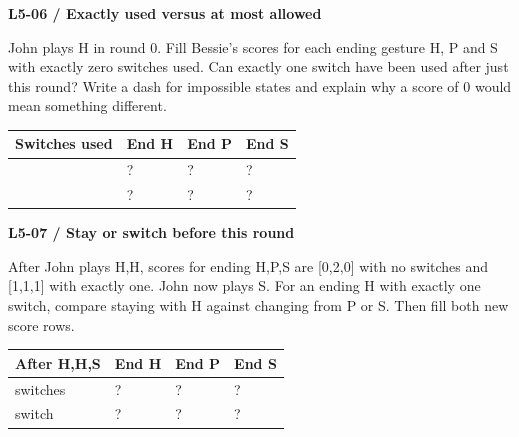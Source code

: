 \documentclass[11pt,a4paper]{article}
\begin{document}
\par\noindent\begin{minipage}{\linewidth}
\textbf{L5-06 / Exactly used versus at most allowed}\par\smallskip John plays H in round 0. Fill Bessie's scores for each ending gesture H, P and S with exactly zero switches used. Can exactly one switch have been used after just this round? Write a dash for impossible states and explain why a score of 0 would mean something different.\par
\par\medskip \begingroup\small\setlength{\tabcolsep}{4pt}\renewcommand{\arraystretch}{1.35}\begin{tabularx}{\linewidth}{>{\raggedright\arraybackslash}X>{\raggedright\arraybackslash}X>{\raggedright\arraybackslash}X>{\raggedright\arraybackslash}X}\toprule\textbf{Switches used} & \textbf{End H} & \textbf{End P} & \textbf{End S}\\\midrule
0 & ? & ? & ?\\
1 & ? & ? & ?\\
\bottomrule\end{tabularx}\endgroup\par\medskip 
\end{minipage}\par\vspace{4mm}
\par\noindent\begin{minipage}{\linewidth}
\textbf{L5-07 / Stay or switch before this round}\par\smallskip After John plays H,H, scores for ending H,P,S are [0,2,0] with no switches and [1,1,1] with exactly one. John now plays S. For an ending H with exactly one switch, compare staying with H against changing from P or S. Then fill both new score rows.\par
\par\medskip \begingroup\small\setlength{\tabcolsep}{4pt}\renewcommand{\arraystretch}{1.35}\begin{tabularx}{\linewidth}{>{\raggedright\arraybackslash}X>{\raggedright\arraybackslash}X>{\raggedright\arraybackslash}X>{\raggedright\arraybackslash}X}\toprule\textbf{After H,H,S} & \textbf{End H} & \textbf{End P} & \textbf{End S}\\\midrule
0 switches & ? & ? & ?\\
1 switch & ? & ? & ?\\
\bottomrule\end{tabularx}\endgroup\par\medskip 
\end{minipage}\par\vspace{4mm}
\end{document}
